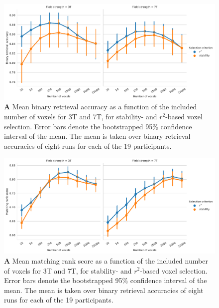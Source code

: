 \begin{figure}[H]
  \centering
  \includegraphics[width=\linewidth]{pics/binary_selection.pdf}
	
  \caption{\textbf{A} Mean binary retrieval accuracy as a function of the
  included number of voxels for 3T and 7T, for stability- and $r^2$-based
  voxel selection. Error bars denote the bootstrapped 95\% confidence interval
  of the mean. The mean is taken over binary retrieval accuracies of eight runs
  for each of the 19 participants.
}

 \label{fig:binary_retrieval_selection}\end{figure}

\begin{figure}[H]
  \centering
    \includegraphics[width=\linewidth]{pics/rank_selection.pdf}
	
  \caption{\textbf{A} Mean matching rank score as a function of the included number
  of voxels for 3T and 7T, for stability- and $r^2$-based voxel selection.
  Error bars denote the bootstrapped 95\% confidence interval of the mean. The
  mean is taken over binary retrieval accuracies of eight runs for each of the
  19 participants.}

 \label{fig:matching_score_selection}
\end{figure}


